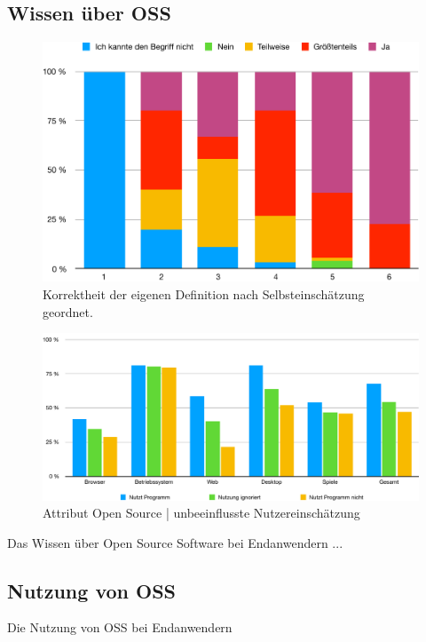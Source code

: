 \documentclass[a4paper]{article}
\begin{document}
    
        \subsection{Wissen über OSS}
            \begin{figure}
                \includegraphics[width=\textwidth]{assets/results/definition/definition.pdf}
                \caption{Korrektheit der eigenen Definition nach Selbsteinschätzung geordnet.}
            \end{figure}
        
            \begin{figure}
                \includegraphics[width=\textwidth]{assets/results/openSourceJudging/openSourceJudging}
                \caption{Attribut Open Source  |  unbeeinflusste Nutzereinschätzung}
            \end{figure}
            Das Wissen über Open Source Software bei Endanwendern ...
            
        \subsection{Nutzung von OSS}
            Die Nutzung von OSS bei Endanwendern
        
\end{document}
